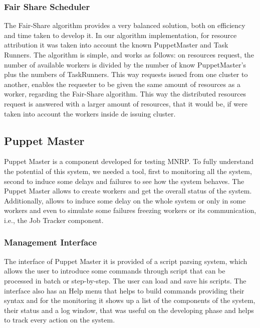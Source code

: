 \documentclass[times, 10pt,twocolumn]{article}
\begin{document}
            \subsubsection{Fair Share Scheduler}\label{fairshare}
            The Fair-Share algorithm provides a very balanced solution, both on efficiency and time taken to develop it. In our algorithm implementation,
            for resource attribution it was taken into account the known PuppetMaster and Task Runners. The algorithm is simple, and works as follows: on resources
            request, the number of available workers is divided by the number of know PuppetMaster's plus the numbers of TaskRunners. This way requests issued from one
            cluster to another, enables the requester to be given the same amount of resources as a worker, regarding the Fair-Share algorithm. This way the distributed
            resources request is answered with a larger amount of resources, that it would be, if were taken into account the workers inside de issuing cluster.

    	\subsection{Puppet Master}
        
	      Puppet Master is a component developed for testing \ac{MNRP}. To fully understand the potential of this system, we needed a tool, first to monitoring all the system, second to induce some delays and failures to see how the system behaves. The Puppet Master allows to create workers and get the overall status of the system. Additionally, allows to induce some delay on the whole system or only in some workers and even to simulate some failures freezing workers or its communication, i.e., the Job Tracker component.
          
            \subsubsection{Management Interface}
            
            The interface of Puppet Master it is provided of a script parsing system, which allows the user to introduce some commands through script that can be processed in batch or step-by-step. The user can load and save his scripts. The interface also has an Help menu that helps to build commands providing their syntax and for the monitoring it shows up a list of the components of the system, their status and a log window, that was useful on the developing phase and helps to track every action on the system.
            
\end{document}
